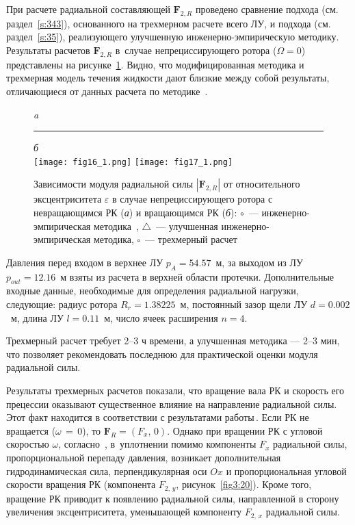 При расчете радиальной составляющей $\textbf{F}_{2,R}$ проведено сравнение
подхода (см. раздел~\ref{s:343}), основанного на трехмерном расчете всего ЛУ, и
подхода (см. раздел~\ref{s:35}), реализующего улучшенную инже\-нер\-но-эм\-пи\-рическую
методику. Результаты расчетов  $\textbf{F}_{2,R}$ в~случае
непрециссирующего ротора ($\Omega = 0$) представлены на рисунке~\ref{fig3:16}.
Видно, что модифицированная методика и  трехмерная модель
течения жидкости дают близкие между собой результаты, отличающиеся от данных
расчета по методике~\cite{lomakin}.
\begin{figure}[!ht]
  \centering\small \emph{a}\rule{90mm}{0mm}\emph{б} \\[1.5mm]
  {\texttt{[image: fig16\_1.png]}}\hfill
  {\texttt{[image: fig17\_1.png]}}
  \caption{Зависимости модуля радиальной силы $|\textbf{F}_{2,R}|$ от относительного 
  эксцентриситета $\varepsilon$ в случае непрециссирующего ротора с
  невращающимся РК ({\it а}) и вращающимся РК ({\it б}):
  $\circ$~--- ин\-же\-нер\-но-эмпирическая методика~\cite{lomakin}, $\triangle$~--- улучшенная 
  инженерно-эмпирическая методика,
  $\square$~--- трехмерный расчет}
  \label{fig3:16}
\end{figure}

Давления перед входом в верхнее ЛУ $p_A=54.57$~м, за выходом из ЛУ $p_{out}=12.16$~м взяты
из расчета в верхней области протечки. Дополнительные входные данные, необходимые
для определения радиальной нагрузки, следующие: радиус ротора  $R_r=1.38225$~м,
постоянный зазор щели ЛУ $d=0.002$~м, длина ЛУ $l=0.11$~м, число ячеек расширения $n=4$.

Трехмерный расчет требует 2--3 ч времени, а улучшенная методика --- 2--3 мин, что позволяет рекомендовать 
последнюю для практической оценки модуля радиальной силы.

Результаты трехмерных расчетов показали, что вращение вала РК и скорость его прецессии оказывают
существенное влияние на направление радиальной силы. Этот факт находится в соответствии с результатами 
работы\,\cite{marcinkovskii}.
Если РК не вращается ($\omega\,=\,0$), то ${\textbf{F}}_R =\left({F_x ,\,0}\right)$. Однако при вращении 
РК с угловой скоростью $\omega$, согласно~\cite{marcinkovskii}, в~уплотнении помимо компоненты $F_x$ 
радиальной силы, пропорциональной перепаду давления, возникает дополнительная
гидродинамическая сила, перпендикулярная оси $Ox$ и пропорциональная угловой скорости вращения 
РК (компонента $F_{2,\,y}$, рисунок~\ref{fig3:20}).
Кроме того, вращение РК приводит к появлению радиальной силы, направленной в сторону увеличения 
эксцентриситета, уменьшающей компоненту $F_{2,\,x}$ радиальной силы.

